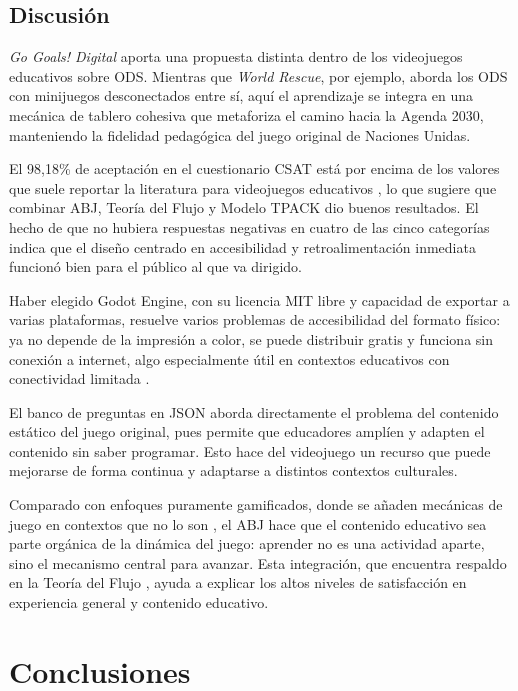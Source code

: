 \documentclass[12pt,a4paper]{article}
\begin{document}
\subsection{Discusión}

\textit{Go Goals! Digital} aporta una propuesta distinta dentro de los videojuegos educativos sobre ODS. Mientras que \textit{World Rescue}, por ejemplo, aborda los ODS con minijuegos desconectados entre sí, aquí el aprendizaje se integra en una mecánica de tablero cohesiva que metaforiza el camino hacia la Agenda 2030, manteniendo la fidelidad pedagógica del juego original de Naciones Unidas.

El 98,18\% de aceptación en el cuestionario CSAT está por encima de los valores que suele reportar la literatura para videojuegos educativos \citep{Hawlitschek2022}, lo que sugiere que combinar ABJ, Teoría del Flujo y Modelo TPACK dio buenos resultados. El hecho de que no hubiera respuestas negativas en cuatro de las cinco categorías indica que el diseño centrado en accesibilidad y retroalimentación inmediata funcionó bien para el público al que va dirigido.

Haber elegido Godot Engine, con su licencia MIT libre y capacidad de exportar a varias plataformas, resuelve varios problemas de accesibilidad del formato físico: ya no depende de la impresión a color, se puede distribuir gratis y funciona sin conexión a internet, algo especialmente útil en contextos educativos con conectividad limitada \citep{UNICEF2022}.

El banco de preguntas en JSON aborda directamente el problema del contenido estático del juego original, pues permite que educadores amplíen y adapten el contenido sin saber programar. Esto hace del videojuego un recurso que puede mejorarse de forma continua y adaptarse a distintos contextos culturales.

Comparado con enfoques puramente gamificados, donde se añaden mecánicas de juego en contextos que no lo son \citep{Mabalay2025}, el ABJ hace que el contenido educativo sea parte orgánica de la dinámica del juego: aprender no es una actividad aparte, sino el mecanismo central para avanzar. Esta integración, que encuentra respaldo en la Teoría del Flujo \citep{Csikszentmihalyi1990}, ayuda a explicar los altos niveles de satisfacción en experiencia general y contenido educativo.

\section{Conclusiones}
\end{document}

